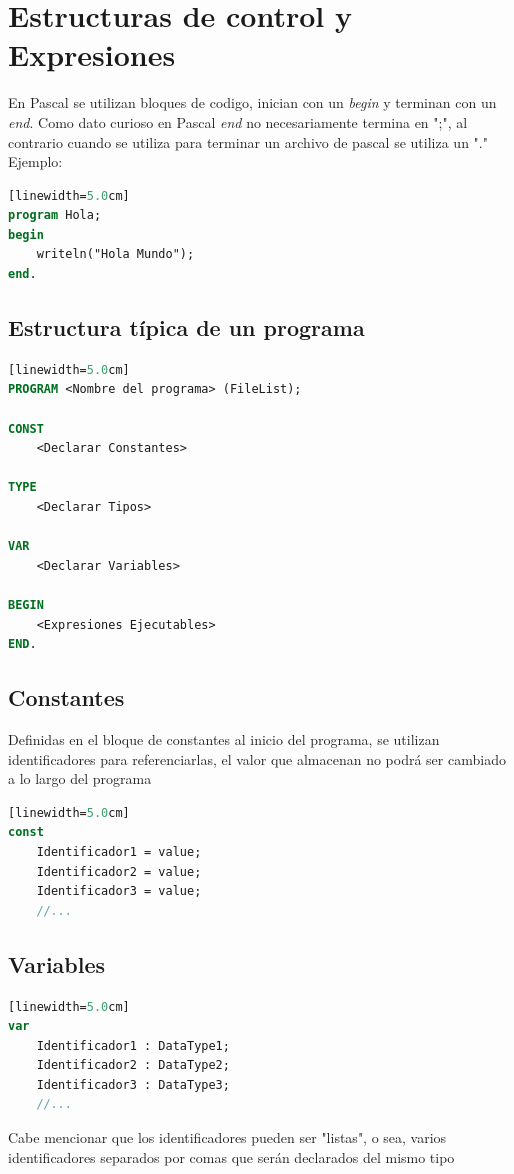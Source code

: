 \documentclass[10pt,journal,compsoc]{IEEEtran}
\begin{document}
\section{Estructuras de control y Expresiones}
En Pascal se utilizan bloques de codigo, inician con un \emph{begin} y terminan con un \emph{end}. Como dato curioso en Pascal \emph{end} no necesariamente termina en ";", al contrario cuando se utiliza para terminar un archivo de pascal se utiliza un "."\\
Ejemplo:
\begin{lstlisting}[language=Pascal, caption = {C\'odigo Hola Mundo en Pascal}][linewidth=5.0cm]
program Hola;
begin
	writeln("Hola Mundo");
end.
\end{lstlisting}

\subsection{Estructura t\'ipica de un programa}
\begin{lstlisting}[language=Pascal, caption = {Estructura t\'ipica de un programa en Pascal}][linewidth=5.0cm]
PROGRAM <Nombre del programa> (FileList);

CONST
	<Declarar Constantes>
	
TYPE
	<Declarar Tipos>
	
VAR
	<Declarar Variables>
	
BEGIN
	<Expresiones Ejecutables>
END.
\end{lstlisting}

\subsection{Constantes}
Definidas en el bloque de constantes al inicio del programa, se utilizan identificadores para referenciarlas, el valor que almacenan no podr\'a ser cambiado a lo largo del programa
\begin{lstlisting}[language=Pascal, caption = {Declaraci\'on de Constantes}][linewidth=5.0cm]
const
	Identificador1 = value;
	Identificador2 = value;
	Identificador3 = value;
	//...
\end{lstlisting}

\subsection{Variables}
\begin{lstlisting}[language=Pascal, caption = {Declaraci\'on de Variables}][linewidth=5.0cm]
var
	Identificador1 : DataType1;
	Identificador2 : DataType2;
	Identificador3 : DataType3;
	//...
\end{lstlisting}
Cabe mencionar que los identificadores pueden ser "listas", o sea, varios identificadores separados por comas que ser\'an declarados del mismo tipo
\end{document}
